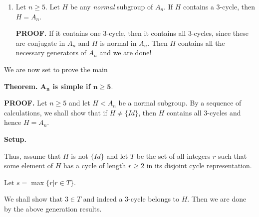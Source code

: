 \documentclass[12pt]{article}
\newcommand{\matr}[2]{\left( \begin{array}{*{#1}{r}}#2\end{array}\right)}
\begin{document}
\begin{enumerate}
{\bf PROOF.} Let two $3$-cycles be $u=\matr{3}{x_1 & x_2 & x_3}$
and $v=\matr{3}{y_1 & y_2 & y_3}$. Make two permutations of
$\{1,2,\cdots,n\}$ as
$$x=\matr{6}{x_1 & x_2 & x_3 & x_4 & x_5 & \cdots} \mbox{ and }
y=\matr{6}{y_1 & y_2 & y_3 & y_4 & y_5 & \cdots}.$$

If the permutation $\sigma$ defined by $\sigma(x_i)=y_i$ is even then it
is the even permutation which conjugates $u$ into $v$ and our proof is
done.

If $\sigma$ is odd, set $z=\matr{6}{y_1 & y_2 & y_3 & y_5 & y_4 &
\cdots}$ and note that the permutation $\tau$ defined by $\tau(x_i)=z_i$
is then an even permutation and it also conjugates $u$ into $v$.

Thus, $u,v$ are conjugate by elements of $A_n$.

{\bf Think!} See what can go wrong if $n=2,3,4$.
\item Let $n\geq 5$.
Let $H$ be any {\it normal} subgroup of $A_n$.
If $H$ contains a $3$-cycle, then $H=A_n$.

{\bf PROOF.}
If it contains one $3$-cycle, then it contains all $3$-cycles, since
these are conjugate in $A_n$ and $H$ is normal in $A_n$. Then $H$
contains all the necessary generators of $A_n$ and we are done!


\end{enumerate}

We are now set to prove the main

{\bf Theorem. $\mathbf{A_n}$ is simple if $\mathbf{n \geq
5.}$}

{\bf PROOF.} Let $n\geq 5$ and let $H<A_n$ be a normal subgroup.
By a sequence of calculations, we shall show that if $H\neq \{Id\}$, then
$H$ contains all $3$-cycles and hence $H=A_n$.

{\bf Setup.}

Thus, assume that $H$ is not $\{Id\}$ and let $T$ be the set of all
integers $r$ such that some element of $H$ has a cycle of length $r\geq
2$ in its disjoint cycle representation.

Let $s=\max\{r|r \in T\}$.

We shall show that $3\in T$ and indeed a $3$-cycle belongs to $H$.
Then we are done by the above generation results.
\end{document}
